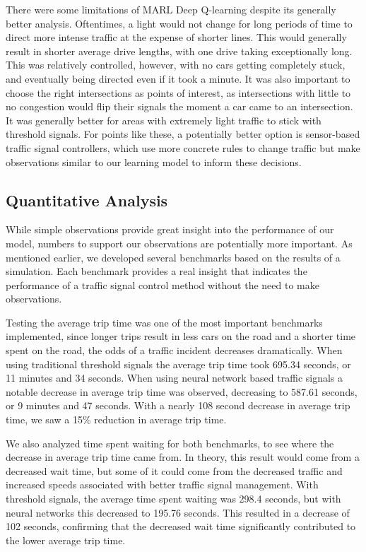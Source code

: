 \documentclass[conference]{IEEEtran}
\begin{document}
There were some limitations of MARL Deep Q-learning despite its generally better analysis. Oftentimes, a light would not change for long periods of time to direct more intense traffic at the expense of shorter lines. This would generally result in shorter average drive lengths, with one drive taking exceptionally long. This was relatively controlled, however, with no cars getting completely stuck, and eventually being directed even if it took a minute. It was also important to choose the right intersections as points of interest, as intersections with little to no congestion would flip their signals the moment a car came to an intersection. It was generally better for areas with extremely light traffic to stick with threshold signals. For points like these, a potentially better option is sensor-based traffic signal controllers, which use more concrete rules to change traffic but make observations similar to our learning model to inform these decisions. 

\subsection{Quantitative Analysis}

While simple observations provide great insight into the performance of our model, numbers to support our observations are potentially more important. As mentioned earlier, we developed several benchmarks based on the results of a simulation. Each benchmark provides a real insight that indicates the performance of a traffic signal control method without the need to make observations. 

Testing the average trip time was one of the most important benchmarks implemented, since longer trips result in less cars on the road and a shorter time spent on the road, the odds of a traffic incident decreases dramatically. When using traditional threshold signals the average trip time took 695.34 seconds, or 11 minutes and 34 seconds. When using neural network based traffic signals a notable decrease in average trip time was observed, decreasing to 587.61 seconds, or 9 minutes and 47 seconds. With a nearly 108 second decrease in average trip time, we saw a 15\% reduction in average trip time. 

We also analyzed time spent waiting for both benchmarks, to see where the decrease in average trip time came from. In theory, this result would come from a decreased wait time, but some of it could come from the decreased traffic and increased speeds associated with better traffic signal management. With threshold signals, the average time spent waiting was 298.4 seconds, but with neural networks this decreased to 195.76 seconds. This resulted in a decrease of 102 seconds, confirming that the decreased wait time significantly contributed to the lower average trip time. 
\end{document}
